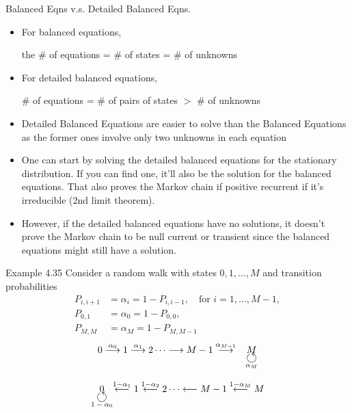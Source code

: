 \documentclass[letterpaper, mathserif]{beamer}
\begin{document}
\begin{frame}{Balanced Eqns v.s. Detailed Balanced Eqns.}

\begin{itemize}
\item For balanced equations, 
\begin{center}the \# of equations = \# of states = \# of unknowns\end{center}
\item For detailed balanced equations,
\begin{center}\# of equations = \# of pairs of states $>$ \# of unknowns\end{center}
\item Detailed Balanced Equations are easier to solve than the Balanced Equations 
as the former ones involve only two unknowns in each equation
\item One can start by solving the detailed balanced equations for the stationary distribution.
If you can find one, it'll also be the solution for the balanced equations.
That also proves the Markov chain if positive recurrent if it's irreducible (2nd limit theorem).
\item However, if the detailed balanced equations have no solutions, 
it doesn't prove the Markov chain to be null current or transient since
the balanced equations might still have a solution.
\end{itemize}
\end{frame}
\begin{frame}{Example 4.35}
Consider a random walk with states $0, 1,\ldots,M$ and transition
probabilities
\begin{align*}
P_{i,i+1} &= \alpha_i = 1 -P_{i,i-1},\quad\text{for } i= 1, \ldots , M - 1,\\
P_{0,1}   &= \alpha_0 = 1 -P_{0,0},\\
P_{M,M}   &= \alpha_M = 1 -P_{M,M-1}
\end{align*}
$$
\begin{array}{cc}
0 \stackrel{\alpha_0}{\longrightarrow}
1 \stackrel{\alpha_1}{\longrightarrow}
2\cdots \longrightarrow
M-1\stackrel{\alpha_{M-1}}{\longrightarrow}&M\\[-3pt]
& {\text{\Large$\circlearrowleft$}}\\[-6pt]
&{\text{\scriptsize$\alpha_M$}}
\end{array}
$$

$$
\begin{array}{c@{\hspace{0pt}}c}
0 &\stackrel{1-\alpha_1}{\longleftarrow}
1 \stackrel{1-\alpha_2}{\longleftarrow}
2\cdots \longleftarrow
M-1\stackrel{1-\alpha_{M}}{\longleftarrow}M\\[-3pt]
{\text{\Large$\circlearrowleft$}}&\\[-6pt]
{\text{\scriptsize$1-\alpha_0$}}&
\end{array}
$$

\end{frame}
\end{document}
